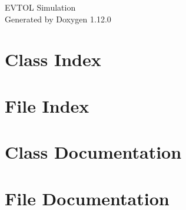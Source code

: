 \documentclass[twoside]{book}
\newcommand{\+}{\discretionary{\mbox{\scriptsize$\hookleftarrow$}}{}{}}
\newcommand{\clearemptydoublepage}{%
    \newpage{\pagestyle{empty}\cleardoublepage}%
  }
\begin{document}
  \raggedbottom
    \hypersetup{pageanchor=false,
                bookmarksnumbered=true,
                pdfencoding=unicode
               }
  \begin{titlepage}
  \vspace*{7cm}
  \begin{center}%
  {\Large EVTOL Simulation}\\
  \vspace*{1cm}
  {\large Generated by Doxygen 1.12.0}\\
  \end{center}
  \end{titlepage}
  \clearemptydoublepage
  \tableofcontents
  \clearemptydoublepage
  \hypersetup{pageanchor=true}
\chapter{Class Index}

\chapter{File Index}

\chapter{Class Documentation}








\chapter{File Documentation}
















  \backmatter
  \newpage
  \clearemptydoublepage
  \printindex
\end{document}
